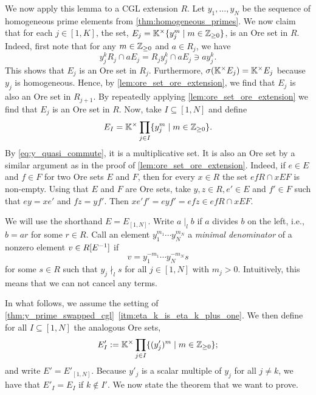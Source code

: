 We now apply this lemma to a CGL extension $R$. Let $y_1, \dots, y_N$ be the sequence
of homogeneous prime elements from \cref{thm:homogeneous_primes}. We now claim that for
each $j \in [1, K]$, the set, $E_j = \mathbb{K}^\times\{y_j^{m} \mid m \in \mathbb{Z}_{\geq 0}\}$,
is an Ore set in $R$. Indeed, first note that for any $m \in \mathbb{Z}_{\geq 0}$ and $a \in
	R_j$, we have
\begin{equation*}
	y_j^k R_j \cap a E_j = R_j y_j^k \cap  a E_j \ni a y_j^k.
\end{equation*}
%
This shows that $E_j$ is an Ore set in $R_j$. Furthermore, $\sigma(\mathbb{K}^\times E_j) =
	\mathbb{K}^\times E_j$ because $y_j$ is homogeneous. Hence, by
\cref{lem:ore_set_ore_extension}, we find that $E_j$ is also an Ore set in $R_{j + 1}$.
By repeatedly applying \cref{lem:ore_set_ore_extension} we find that $E_j$ is an Ore
set in $R$. Now, take $I \subseteq [1, N]$ and define
\begin{equation*}
	E_I = \mathbb{K}^\times \prod_{j \in I}\{y_j^m \mid m \in \mathbb{Z}_{\geq 0}\}.
\end{equation*}
%
By \cref{eq:y_quasi_commute}, it is a multiplicative set. It is also an Ore set by a
similar argument as in the proof of \cref{lem:ore_set_ore_extension}. Indeed, if $e \in
	E$ and $f \in F$ for two Ore sets $E$ and $F$, then for every $x \in R$ the set $ef R
	\cap x E F$ is non-empty. Using that $E$ and $F$ are Ore sets, take $y, z \in R, e' \in
	E$ and $f' \in F$ such that $ey = xe'$ and $fz = yf'$. Then $xe'f' = eyf' = efz \in efR
	\cap xEF$.

We will use the shorthand $E = E_{[1,N]}$. Write $a \mid_l b$ if $a$ divides $b$ on the
left, i.e., $b = ar$ for some $r \in R$. Call an element $y_1^{m_1}\cdots y_N^{m_N}$ a
\emph{minimal denominator} of a nonzero element $v\in
	R[E^{-1}]$ if
\begin{equation*}
	v = y_1^{-m_1}\cdots y_N^{-m_N} s
\end{equation*}
%
for some $s \in R$ such that $y_j \nmid_l s$ for all $j\in [1,N]$ with $m_j > 0$.
Intuitively, this means that we can not cancel any terms.

In what follows, we assume the setting of
\cref{thm:y_prime_swapped_cgl}~\ref*{itm:eta_k_is_eta_k_plus_one}. We then define for
all $I \subseteq [1, N]$ the analogous Ore sets,
\begin{equation*}
	E'_{I} := \mathbb{K}^\times \prod_{j \in I}\{(y'_j)^m \mid m \in \mathbb{Z}_{\geq 0}\};
\end{equation*}
%
and write $E' = E'_{[1, N]}$. Because $y'_j$ is a scalar multiple of $y_j$ for all $j
	\neq k$, we have that $E'_I = E_I$ if $k \notin I'$. We now state the theorem that we
want to prove.

